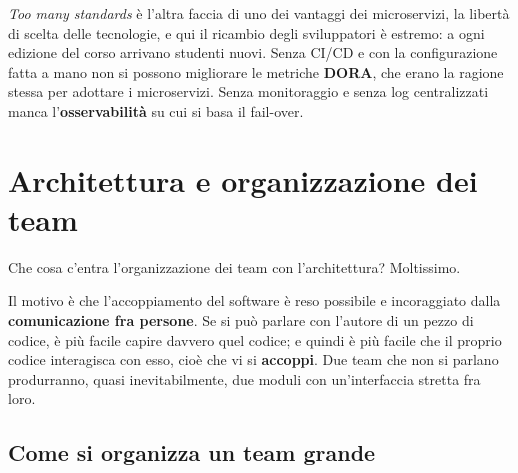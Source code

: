\textit{Too many standards} è l'altra faccia di uno dei vantaggi dei microservizi, la libertà di scelta delle tecnologie,
e qui il ricambio degli sviluppatori è estremo: a ogni edizione del corso arrivano studenti nuovi. Senza CI/CD e con la
configurazione fatta a mano non si possono migliorare le metriche \textbf{DORA}, che erano la ragione stessa per adottare i
microservizi. Senza monitoraggio e senza log centralizzati manca l'\textbf{osservabilità} su cui si basa il fail-over.


\section{Architettura e organizzazione dei team}

Che cosa c'entra l'organizzazione dei team con l'architettura? Moltissimo.


Il motivo è che l'accoppiamento del software è reso possibile e incoraggiato dalla \textbf{comunicazione fra persone}. Se si
può parlare con l'autore di un pezzo di codice, è più facile capire davvero quel codice; e quindi è più facile che il
proprio codice interagisca con esso, cioè che vi si \textbf{accoppi}. Due team che non si parlano produrranno, quasi
inevitabilmente, due moduli con un'interfaccia stretta fra loro.

\subsection{Come si organizza un team grande}

